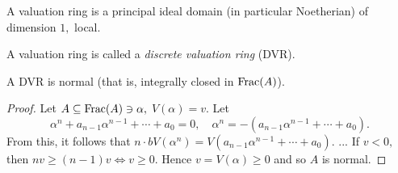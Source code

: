 \begin{corollary}
  A valuation ring is a principal ideal domain (in particular Noetherian) of dimension \(1,\) local.
\end{corollary}

\begin{df}
  A valuation ring is called a \emph{discrete valuation ring} (DVR).
\end{df}

\begin{lemma}
  A DVR is normal (that is, integrally closed in \(\mathrm{Frac}(A)\)).
\end{lemma}
\begin{proof}
  Let \(A \subseteq \mathrm{Frac}(A) \ni \alpha,\) \(V(\alpha) = v.\)
  Let
  \[\alpha^n + a_{n-1} \alpha^{n-1} + \dotsb + a_0 = 0, \quad \alpha^{n} = -(a_{n-1} \alpha^{n-1} + \dotsb + a_0).\]
  From this, it follows that
  \(n \cdot b V(\alpha^n) = V(a_{n-1} \alpha^{n-1} + \dotsb + a_0).\)
  ...
  If \(v < 0,\) then \(nv \geq (n-1)v \iff v \geq 0.\) Hence \(v = V(\alpha) \geq 0\) and so \(A\) is normal.
\end{proof}

